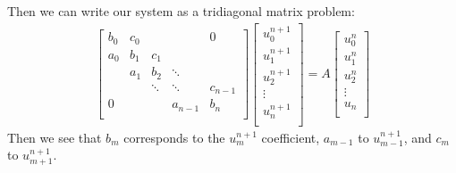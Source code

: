 \documentclass[a4paper,10pt]{article}
\begin{document}
Then we can write our system as a tridiagonal matrix problem: 
\begin{align*}
\begin{bmatrix}
   {b_0} & {c_0} & {   } & {   } & { 0 } \\
   {a_0} & {b_1} & {c_1} & {   } & {   } \\
   {   } & {a_1} & {b_2} & \ddots & {   } \\
   {   } & {   } & \ddots & \ddots & {c_{n-1}}\\
   { 0 } & {   } & {   } & {a_{n-1}} & {b_n}\\
\end{bmatrix}
\begin{bmatrix}
   {u_0^{n+1} }  \\
   {u_1^{n+1} }  \\
   {u_2^{n+1} }  \\
   \vdots   \\
   {u_n^{n+1} }  \\
\end{bmatrix}
=
A \begin{bmatrix}
   {u_0^n }  \\
   {u_1^n }  \\
   {u_2^n }  \\
   \vdots   \\
   {u_n }  \\
\end{bmatrix}
\end{align*}
Then we see that $b_{m}$ corresponds to the $u_{m}^{n+1}$ coefficient, $a_{m-1}$ to $u_{m-1}^{n+1}$, and $c_{m}$ to $u_{m+1}^{n+1}$.
\end{document}
